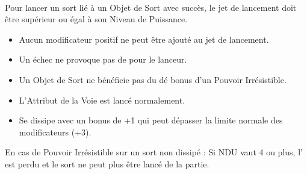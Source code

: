 {\begin{multicols}{2}
\vspace*{10pt}

\begin{framed}
\vspace*{-17pt}
\paragraph{\boundspells{}}

Pour lancer un sort lié à un Objet de Sort avec succès, le jet de lancement doit être supérieur ou égal à son Niveau de Puissance.
\begin{itemize}[label={-}]
\item Aucun modificateur positif ne peut être ajouté au jet de lancement.
\item Un échec ne provoque pas de \lostfocus{}
 pour le lanceur.
\item Un Objet de Sort ne bénéficie pas du dé bonus d'un Pouvoir Irrésistible.
\item L'Attribut de la Voie est lancé normalement.
\item Se dissipe avec un bonus de +1 qui peut dépasser la limite normale des modificateurs (+3).
\end{itemize}

En cas de Pouvoir Irrésistible sur un sort non dissipé :\newline
Si NDU vaut 4 ou plus, l'\boundspell{} est perdu et le sort ne peut plus être lancé de la partie.
\end{framed}

\vspace*{\fill}
\end{multicols}
}


